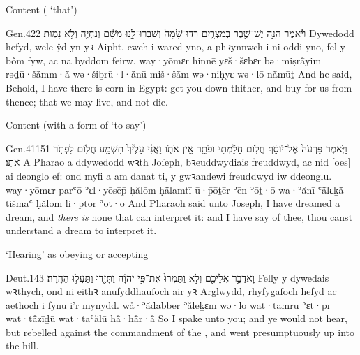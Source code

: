 \begin{frame}{\ex Content ( ‘that’)}
	\begin{example}{Gen.}{42}{2}{}{}
		\quoling
		{וַיֹּ֕אמֶר הִנֵּ֣ה   יֶשׁ־שֶׁ֖בֶר בְּמִצְרָ֑יִם רְדוּ־שָׁ֙מָּה֙ וְשִׁבְרוּ־לָ֣נוּ מִשָּׁ֔ם וְנִחְיֶ֖ה וְלֹ֥א נָמֽוּת׃}
		{Dywedodd hefyd, wele   ŷd yn yꝛ Aipht, ewch i wared yno, a phꝛynnwch i ni oddi yno, fel y bôm fyw, ac na byddom feirw.}
		{way·yōmɛr hinnē   yɛš·šɛḇɛr bə·miṣrå̄yim rəḏū·šå̄mm·å̄ wə·šiḇrū·l·å̄nū miš·šå̄m wə·niḥyɛ wə·lō nå̄mūṯ}
		{And he said, Behold, I have   there is corn in Egypt: get you down thither, and buy for us from thence; that we may live, and not die.}
	\end{example}
\end{frame}


\begin{frame}{\ex Content (with a form of  ‘to say’)}
	\begin{example}{Gen.}{41}{15}{1}{}
		\quoling
		{וַיֹּ֤אמֶר פַּרְעֹה֙ אֶל־יֹוסֵ֔ף חֲלֹ֣ום חָלַ֔מְתִּי וּפֹתֵ֖ר אֵ֣ין אֹתֹ֑ו וַאֲנִ֗י  עָלֶ֙יךָ֙  תִּשְׁמַ֥ע חֲלֹ֖ום לִפְתֹּ֥ר אֹתֹֽו׃}
		{A Pharao a ddywedodd wꝛth Joſeph, bꝛeuddwydiais freuddwyd, ac nid [oes] ai deonglo ef: ond myfi a   am danat ti, y gwꝛandewi freuddwyd iw ddeonglu.}
		{way·yōmɛr parʿō ʾɛl·yōsēp̄ ḥălōm ḥå̄lamtī ū·p̄ōṯēr ʾēn ʾōṯ·ō wa·ʾănī  ʿå̄lɛḵå̄  tišmaʿ ḥălōm li·p̄tōr ʾōṯ·ō}
		{And Pharaoh said unto Joseph, I have dreamed a dream, and \emph{there is} none that can interpret it: and I have  say of thee,  thou canst understand a dream to interpret it.}
	\end{example}
\end{frame}




\begin{frame}{\ex ‘Hearing’ as obeying or accepting}
	\begin{example}{Deut.}{1}{43}{}{}
		\quoling
		{וָאֲדַבֵּ֥ר אֲלֵיכֶ֖ם וְלֹ֣א  וַתַּמְרוּ֙ אֶת־פִּ֣י יְהוָ֔ה וַתָּזִ֖דוּ וַתַּעֲל֥וּ הָהָֽרָה׃}
		{Felly y dywedais wꝛthych, ond ni  eithꝛ anufyddhauſoch air yꝛ Arglwydd, rhyfygaſoch hefyd ac aethoch i fynu i'r mynydd.}
		{wå̄·ʾăḏabbēr ʾălēḵɛm wə·lō  wat·tamrū ʾɛṯ·pī {\YHWH} wat·tå̄zīḏū wat·taʿălū hå̄·hå̄r·å̄}
		{So I spake unto you; and ye would not hear, but rebelled against the commandment of the {\LORD}, and went presumptuously up into the hill.}
	\end{example}
\end{frame}


